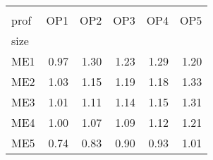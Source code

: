 \begin{tabular}{lrrrrr}
\toprule
{} \\
prof &   OP1 &   OP2 &   OP3 &   OP4 &   OP5 \\
size &       &       &       &       &       \\
\midrule
ME1  &  0.97 &  1.30 &  1.23 &  1.29 &  1.20 \\
ME2  &  1.03 &  1.15 &  1.19 &  1.18 &  1.33 \\
ME3  &  1.01 &  1.11 &  1.14 &  1.15 &  1.31 \\
ME4  &  1.00 &  1.07 &  1.09 &  1.12 &  1.21 \\
ME5  &  0.74 &  0.83 &  0.90 &  0.93 &  1.01 \\
\bottomrule
\end{tabular}
